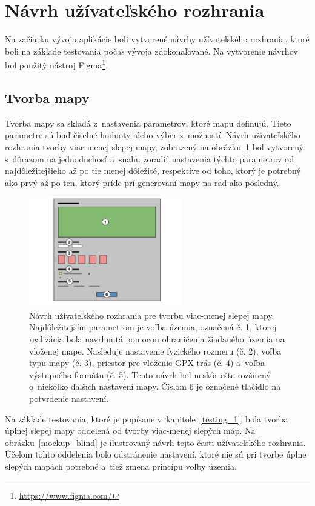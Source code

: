 \section{Návrh užívateľského rozhrania}
\label{idea_interface}
Na začiatku vývoja aplikácie boli vytvorené návrhy užívateľského rozhrania, ktoré boli na základe testovania počas vývoja zdokonaľované. Na vytvorenie návrhov bol použitý nástroj Figma\footnote{\url{https://www.figma.com/}}.

\subsection*{Tvorba mapy}
Tvorba mapy sa skladá z~nastavenia parametrov, ktoré mapu definujú. Tieto parametre sú buď číselné hodnoty alebo výber z~možností. Návrh užívateľského rozhrania tvorby viac-menej slepej mapy, zobrazený na obrázku~\ref{mockup_map} bol vytvorený s~dôrazom na jednoduchosť a~snahu zoradiť nastavenia týchto parametrov od najdôležitejšieho až po tie menej dôležité, respektíve od toho, ktorý je potrebný ako prvý až po ten, ktorý príde pri generovaní mapy na rad ako posledný. 

\begin{figure}[hbt]
	\centering
	\includegraphics[width=0.6\textwidth]{obrazky-figures/prototype_map.pdf}
	\caption{Návrh užívateľského rozhrania pre tvorbu viac-menej slepej mapy. Najdôležitejším parametrom je voľba územia, označená č. 1, ktorej realizácia bola navrhnutá pomocou ohraničenia žiadaného územia na vloženej mape. Nasleduje nastavenie fyzického rozmeru (č. 2), voľba typu mapy (č. 3), priestor pre vloženie GPX trás (č. 4) a~voľba výstupného formátu (č. 5). Tento návrh bol neskôr ešte rozšírený o~niekoľko ďalších nastavení mapy. Číslom 6 je označené tlačidlo na potvrdenie nastavení.}
	\label{mockup_map}
\end{figure}

Na základe testovania, ktoré je popísane v~kapitole~\ref{testing_1}, bola tvorba úplnej slepej mapy oddelená od tvorby viac-menej slepých máp. Na obrázku~\ref{mockup_blind} je ilustrovaný návrh tejto časti užívateľského rozhrania. Účelom tohto oddelenia bolo odstránenie nastavení, ktoré nie sú pri tvorbe úplne slepých mapách potrebné a~tiež zmena princípu voľby územia.

